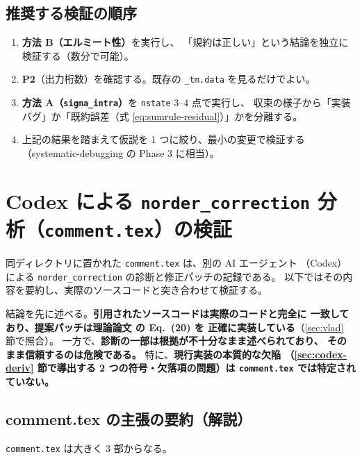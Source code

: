 \documentclass[dvipdfmx,a4paper,11pt]{jsarticle}
\newcommand{\file}[1]{\texttt{#1}}
\begin{document}
\subsection{推奨する検証の順序}

\begin{enumerate}
\item \textbf{方法 B（エルミート性）}を実行し、
      「規約は正しい」という結論を独立に検証する（数分で可能）。
\item \textbf{P2}（出力桁数）を確認する。既存の \file{\_tm.data} を見るだけでよい。
\item \textbf{方法 A（\texttt{sigma\_intra}）}を \file{nstate} 3--4 点で実行し、
      収束の様子から「実装バグ」か「既約誤差（式 \eqref{eq:sumrule-residual}）」かを分離する。
\item 上記の結果を踏まえて仮説を 1 つに絞り、最小の変更で検証する
      （systematic-debugging の Phase 3 に相当）。
\end{enumerate}

\section{Codex による \texttt{norder\_correction} 分析（\texttt{comment.tex}）の検証}
\label{sec:codex-review}

同ディレクトリに置かれた \file{comment.tex} は、別の AI エージェント
（Codex）による \file{norder\_correction} の診断と修正パッチの記録である。
以下ではその内容を要約し、実際のソースコードと突き合わせて検証する。

結論を先に述べる。\textbf{引用されたソースコードは実際のコードと完全に
一致しており、提案パッチは理論論文 \cite{yakovlev2017} の Eq.~(20) を
正確に実装している}（\ref{sec:vlad} 節で照合）。
一方で、\textbf{診断の一部は根拠が不十分なまま述べられており、
そのまま信頼するのは危険である。} 特に、\textbf{現行実装の本質的な欠陥
（\ref{sec:codex-deriv} 節で導出する 2 つの符号・欠落項の問題）は
\file{comment.tex} では特定されていない。}

\subsection{comment.tex の主張の要約（解説）}

\file{comment.tex} は大きく 3 部からなる。
\end{document}
